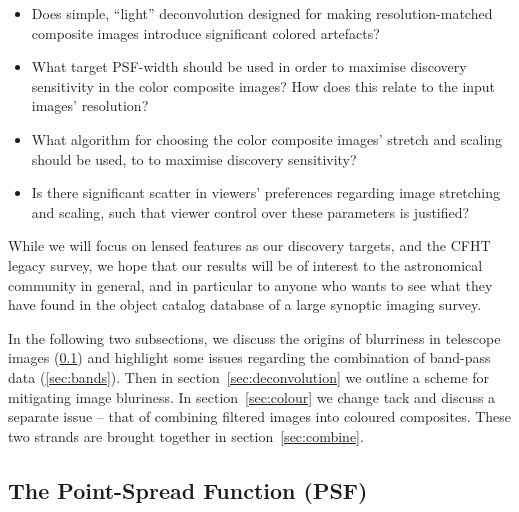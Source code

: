 \documentclass[letterpaper, 11pt]{article}
\begin{document}
\begin{itemize}

	\item Does simple, ``light'' deconvolution designed for making
resolution-matched composite images introduce significant colored artefacts?

	\item What target PSF-width should be used in order to
maximise discovery sensitivity in the color composite images? How does this
relate to the input images' resolution?

	\item What algorithm for choosing the color composite images' stretch and
scaling should be used, to to maximise discovery sensitivity? 

	\item Is there significant scatter in viewers' preferences regarding image
stretching and scaling, such that viewer control over these parameters is
justified?

\end{itemize}

While we will focus on lensed features as our discovery targets, and the CFHT legacy
survey, we hope that our results will be of interest to the astronomical
community in general, and in particular to anyone who wants to see what they
have found in the object catalog database of a large synoptic imaging survey.

In the following two subsections, we discuss the origins of blurriness in telescope images (\ref{sec:psf}) and highlight some issues regarding the combination of band-pass data (\ref{sec:bands}). Then in section~\ref{sec:deconvolution} we outline a scheme for mitigating image bluriness. In section~\ref{sec:colour} we change tack and discuss a separate issue -- that of combining filtered images into coloured composites. These two strands are brought together in section~\ref{sec:combine}.


\subsection{The Point-Spread Function (PSF)}
\label{sec:psf}
\end{document}
